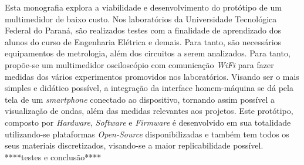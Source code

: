 

\begin{resumoutfpr}%
  Esta monografia explora a viabilidade e desenvolvimento do protótipo de um multimedidor de baixo custo. Nos laboratórios da Universidade Tecnológica Federal do Paraná, são realizados testes com a finalidade de aprendizado dos alunos do curso de Engenharia Elétrica e demais. Para tanto, são necessários equipamentos de metrologia, além dos circuitos a serem analizados. Para tanto, propõe-se um multimedidor osciloscópio com comunicação \textit{WiFi} para fazer medidas dos vários experimentos promovidos nos laboratórios. Visando ser o mais simples e didático possível, a integração da interface homem-máquina se dá pela tela de um \textit{smartphone} conectado ao dispositivo, tornando assim possível a visualização de ondas, além das medidas relevantes aos projetos. Este protótipo, composto por \textit{Hardware}, \textit{Software} e \textit{Firmware} é desenvolvido em sua totalidade utilizando-se plataformas \textit{Open-Source} disponibilizadas e também tem todos os seus materiais discretizados, visando-se a maior replicabilidade possível. ****testes e conclusão****
\end{resumoutfpr}
